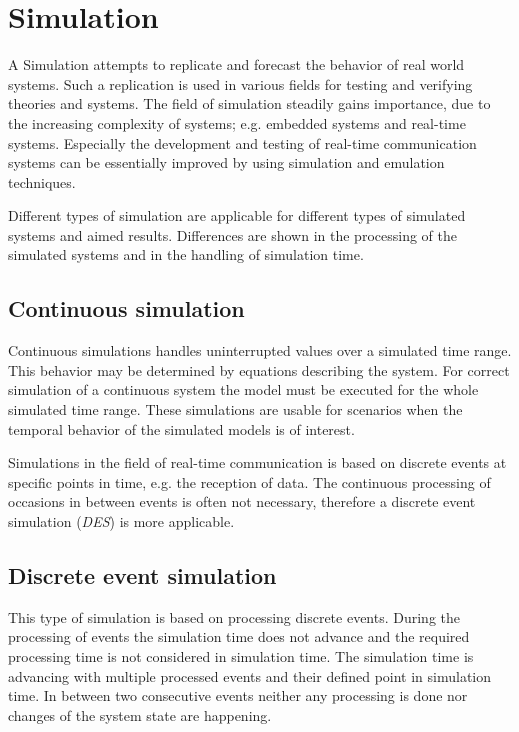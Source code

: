 \chapter{Simulation}
\label{cha:simulation}

A Simulation attempts to replicate and forecast the behavior of real world systems.
Such a replication is used in various fields for testing and verifying theories and systems.
The field of simulation steadily gains importance, due to the increasing complexity of systems; e.g. embedded systems and real-time systems.
Especially the development and testing of real-time communication systems can be essentially improved by using simulation and emulation techniques.

Different types of simulation are applicable for different types of simulated systems and aimed results.
Differences are shown in the processing of the simulated systems and in the handling of simulation time.
\cite[section 1.2]{mchaney2009understanding}

\section{Continuous simulation}
\label{sec:simulation_cont}
Continuous simulations handles uninterrupted values over a simulated time range.
This behavior may be determined by equations describing the system.
For correct simulation of a continuous system the model must be executed for the whole simulated time range.
These simulations are usable for scenarios when the temporal behavior of the simulated models is of interest. \cite[section 1.2.1]{mchaney2009understanding}

Simulations in the field of real-time communication is based on discrete events at specific points in time, e.g. the reception of data.
The continuous processing of occasions in between events is often not necessary, therefore a discrete event simulation (\emph{DES}) is more applicable.

\section{Discrete event simulation}
\label{sec:simulation_event}
This type of simulation is based on processing discrete events.
During the processing of events the simulation time does not advance and the required processing time is not considered in simulation time.
The simulation time is advancing with multiple processed events and their defined point in simulation time.
In between two consecutive events neither any processing is done nor changes of the system state are happening. \cite[chapter 1]{matloff_introduction_2008}

